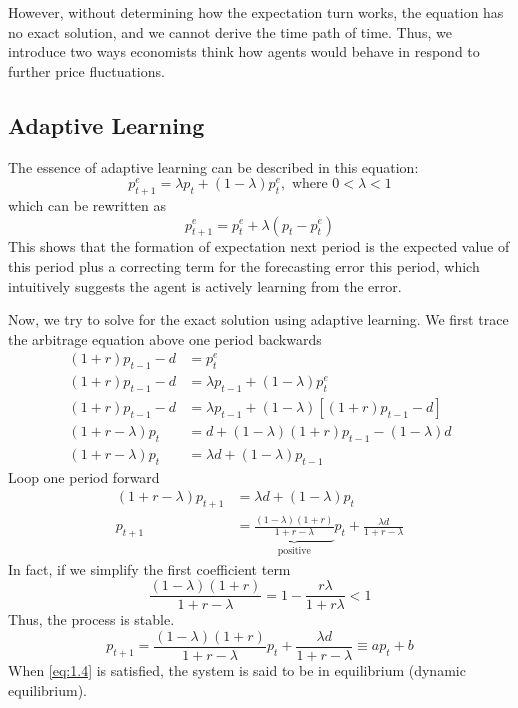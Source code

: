 \documentclass[twocolumn, fleqn]{article}
\begin{document}
		However, without determining how the expectation turn works, the equation has no exact solution, and we
		cannot derive the time path of time.
		Thus, we introduce two ways economists think how agents would behave in respond to further price fluctuations.

		\subsection{Adaptive Learning}
			The essence of adaptive learning can be described in this equation:
			\begin{equation}
				p_{t+1}^e = \lambda p_t + (1-\lambda)p_t^e, \text{ where } 0<\lambda<1
			\end{equation}
			which can be rewritten as
			\begin{equation*}
				p_{t+1}^e = p_t^e + \lambda(p_t - p_t^e)
			\end{equation*}
			This shows that the formation of expectation next period is the expected value of this period plus a
			correcting term for the forecasting error this period, which intuitively suggests the agent is actively learning from the error.

			Now, we try to solve for the exact solution using adaptive learning.
			We first trace the arbitrage equation above one period backwards
			\begin{align*}
			(1+r)p_{t-1} -d &=  p_t^e\\
			(1+r)p_{t-1} -d &= \lambda p_{t-1} + (1-\lambda)p_t^e\\
			(1+r)p_{t-1} -d &= \lambda p_{t-1} + (1-\lambda)[(1+r)p_{t-1}-d]\\
			(1+r-\lambda) p_t &= d + (1-\lambda)(1+r)p_{t-1} - (1-\lambda)d\\
			(1+r-\lambda) p_t &= \lambda d + (1-\lambda)p_{t-1}
			\end{align*}
			Loop one period forward
			\begin{align*}
			(1+r-\lambda) p_{t+1} &= \lambda d + (1-\lambda)p_{t}\\[4pt]
			p_{t+1}&= \underbrace{\frac{(1-\lambda)(1+r)}{1+r-\lambda}}_{\text{positive}} p_t + \frac{\lambda d}{1+r-\lambda}
			\end{align*}
			In fact, if we simplify the first coefficient term
			\begin{equation*}
				\frac{(1-\lambda)(1+r)}{1+r-\lambda} = 1-\frac{r \lambda}{1+r\lambda}<1
			\end{equation*}
			Thus, the process is stable.
			\begin{equation}
				p_{t+1} = \frac{(1-\lambda)(1+r)}{1+r-\lambda} p_t + \frac{\lambda d}{1+r-\lambda} \equiv a p_t+b
				\label{eq:1.4}
			\end{equation}
			When \eqref{eq:1.4} is satisfied, the system is said to be in equilibrium (dynamic equilibrium).
\end{document}
